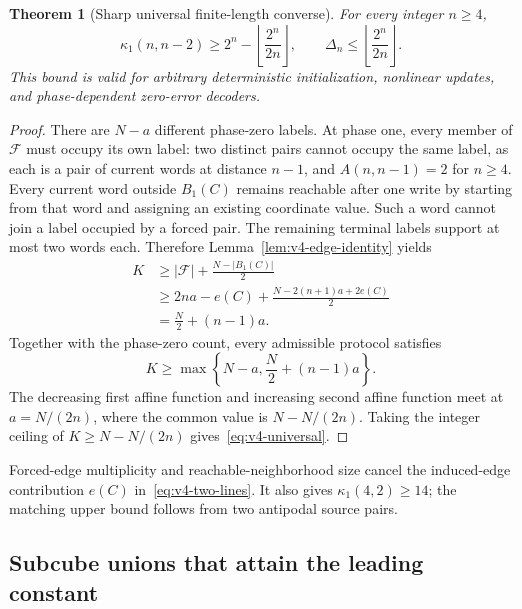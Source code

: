 \documentclass[11pt,a4paper]{article}
\newtheorem{theorem}{Theorem}[section]
\begin{document}
\begin{theorem}[Sharp universal finite-length converse]\label{thm:v4-converse}
For every integer $n\ge4$,
\begin{equation}\label{eq:v4-universal}
 \boxed{\quad\kappa_1(n,n-2)\ge
 2^n-\left\lfloor\frac{2^n}{2n}\right\rfloor,
 \qquad \Delta_n\le\left\lfloor\frac{2^n}{2n}\right\rfloor.\quad}
\end{equation}
This bound is valid for arbitrary deterministic initialization, nonlinear updates, and phase-dependent zero-error decoders.
\end{theorem}
\begin{proof}
There are $N-a$ different phase-zero labels. At phase one, every member of $\mathcal F$ must occupy its own label: two distinct pairs cannot occupy the same label, as each is a pair of current words at distance $n-1$, and $A(n,n-1)=2$ for $n\ge4$. Every current word outside $B_1(C)$ remains reachable after one write by starting from that word and assigning an existing coordinate value. Such a word cannot join a label occupied by a forced pair. The remaining terminal labels support at most two words each. Therefore Lemma~\ref{lem:v4-edge-identity} yields
\begin{align}
 K&\ge |\mathcal F|+\frac{N-|B_1(C)|}{2}\\
  &\ge 2na-e(C)+\frac{N-2(n+1)a+2e(C)}{2}\\
  &=\frac N2+(n-1)a.
\end{align}
Together with the phase-zero count, every admissible protocol satisfies
\begin{equation}\label{eq:v4-two-lines}
 \boxed{\quad K\ge\max\left\{N-a,\frac N2+(n-1)a\right\}.\quad}
\end{equation}
The decreasing first affine function and increasing second affine function meet at $a=N/(2n)$, where the common value is $N-N/(2n)$. Taking the integer ceiling of $K\ge N-N/(2n)$ gives~\eqref{eq:v4-universal}.
\end{proof}

Forced-edge multiplicity and reachable-neighborhood size cancel the induced-edge contribution $e(C)$ in~\eqref{eq:v4-two-lines}. It also gives $\kappa_1(4,2)\ge14$; the matching upper bound follows from two antipodal source pairs.

\subsection{Subcube unions that attain the leading constant}
\end{document}
